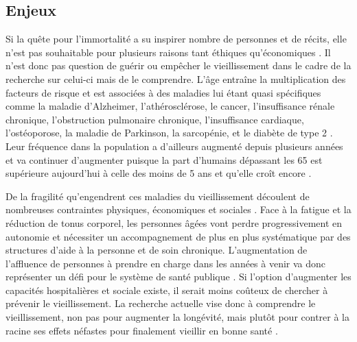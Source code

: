\subsection{Enjeux}

Si la quête pour l'immortalité a su inspirer nombre de personnes et de récits, elle n'est pas souhaitable pour plusieurs raisons tant éthiques qu'économiques \cite{Hayflick2000}. Il n'est donc pas question de guérir ou empêcher le vieillissement dans le cadre de la recherche sur celui-ci mais de le comprendre. L'âge entraîne la multiplication des facteurs de risque et est associées à des maladies lui étant quasi spécifiques comme la maladie d'Alzheimer, l'athérosclérose, le cancer, l'insuffisance rénale chronique, l'obstruction pulmonaire chronique, l'insuffisance cardiaque, l'ostéoporose, la maladie de Parkinson, la sarcopénie, et le diabète de type 2 \cite{Kubben2017}. Leur fréquence dans la population a d'ailleurs augmenté depuis plusieurs années et va continuer d'augmenter puisque la part d'humains dépassant les 65 est supérieure aujourd'hui à celle des moins de 5 ans et qu'elle croît encore \cite{Phillips2021Apr}. 

De la fragilité qu'engendrent ces maladies du vieillissement découlent de nombreuses contraintes physiques, économiques et sociales \cite{Blasimme2017Feb}. Face à la fatigue et la réduction de tonus corporel, les personnes âgées vont perdre progressivement en autonomie et nécessiter un accompagnement de plus en plus systématique par des structures d'aide à la personne et de soin chronique. L'augmentation de l'affluence de personnes à prendre en charge dans les années à venir va donc représenter un défi pour le système de santé publique \cite{Phillips2021Apr}. Si l'option d'augmenter les capacités hospitalières et sociale existe, il serait moins coûteux de chercher à prévenir le vieillissement. La recherche actuelle vise donc à comprendre le vieillissement, non pas pour augmenter la longévité, mais plutôt pour contrer à la racine ses effets néfastes pour finalement vieillir en bonne santé \cite{Ferrucci2020Feb}.





